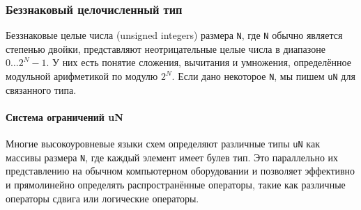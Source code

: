 \subsubsection{Беззнаковый целочисленный тип} Беззнаковые целые числа (unsigned integers) размера \texttt{N}, где \texttt{N} обычно является степенью двойки, представляют неотрицательные целые числа в диапазоне $0\ldots 2^N-1$. У них есть понятие сложения, вычитания и умножения, определённое модульной арифметикой по модулю $2^N$. Если дано некоторое \texttt{N}, мы пишем \texttt{uN} для связанного типа.

\paragraph{Система ограничений uN} Многие высокоуровневые языки схем определяют различные типы \texttt{uN} как массивы размера \texttt{N}, где каждый элемент имеет булев тип. Это параллельно их представлению на обычном компьютерном оборудовании и позволяет эффективно и прямолинейно определять распространённые операторы, такие как различные операторы сдвига или логические операторы.

